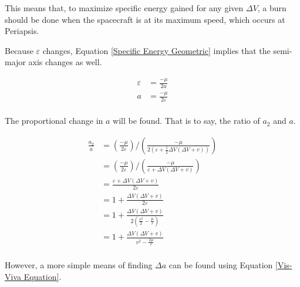 \documentclass[../basicOrbitalDynamics.tex]{subfiles}
\begin{document}
This means that, to maximize specific energy gained for any given $\Delta V$, a burn should be done when the spacecraft is at its maximum speed, which occurs at Periapsis.

Because $\varepsilon$ changes, Equation  \eqref{Specific Energy Geometric} implies that the semi-major axis changes as well.

\begin{align*}
    \varepsilon & = \frac{-\mu}{2a}           \\
    a           & = \frac{-\mu}{2\varepsilon} \\
\end{align*}

The proportional change in $a$ will be found. That is to say, the ratio of $a_2$ and $a$.

\begin{align*}
    \frac{a_2}{a} & = (\frac{-\mu}{2\varepsilon})/(\frac{-\mu}{2(\varepsilon+\frac{1}{2}\Delta V\left(\Delta V+v\right))})         \\
                  & = \left(\frac{-\mu}{2\varepsilon}\right)/\left(\frac{-\mu}{\varepsilon+\Delta V\left(\Delta V+v\right)}\right) \\
                  & = \frac{\varepsilon+\Delta V\left(\Delta V+v\right)}{2\varepsilon}                                             \\
                  & = 1+\frac{\Delta V\left(\Delta V+v\right)}{2\varepsilon}                                                       \\
                  & = 1+\frac{\Delta V\left(\Delta V+v\right)}{2\left(\frac{v^2}{2}-\frac{\mu{}}{r}\right)}                        \\
                  & = 1+\frac{\Delta V\left(\Delta V+v\right)}{v^2-\frac{2\mu{}}{r}}                                               \\
\end{align*}

However, a more simple means of finding $\Delta a$ can be found using Equation  \eqref{Vis-Viva Equation}.
\end{document}
